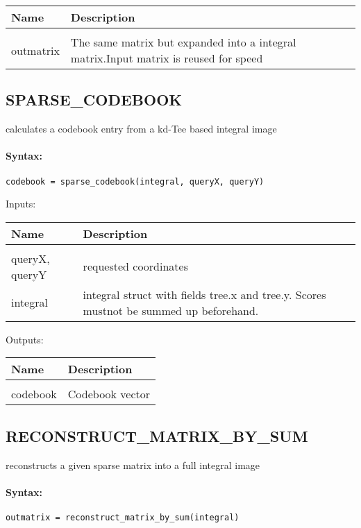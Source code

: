 \begin{tabular}{|l|p{5cm}|}
\hline
\textbf{Name} & \textbf{Description} \\
\hline \hline \\
outmatrix & The same matrix but expanded into a integral matrix.Input matrix is reused for speed  \\ \hline
\end{tabular}

\subsection{SPARSE\_CODEBOOK}

calculates a codebook entry from a kd-Tee based integral image

\paragraph{Syntax:} \verb|codebook = sparse_codebook(integral, queryX, queryY)|

Inputs:

\begin{tabular}{|l|p{5cm}|}
\hline
\textbf{Name} & \textbf{Description} \\
\hline \hline \\
queryX, queryY & requested coordinates  \\ \hline
integral & integral struct with fields tree.x and tree.y. Scores mustnot be summed up beforehand.  \\ \hline
\end{tabular}
Outputs:

\begin{tabular}{|l|p{5cm}|}
\hline
\textbf{Name} & \textbf{Description} \\
\hline \hline \\
codebook & Codebook vector  \\ \hline
\end{tabular}

\subsection{RECONSTRUCT\_MATRIX\_BY\_SUM}

reconstructs a given sparse matrix into a full integral image

\paragraph{Syntax:} \verb|outmatrix = reconstruct_matrix_by_sum(integral)|

